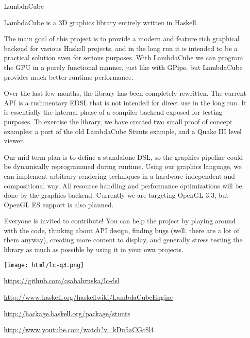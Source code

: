 \begin{hcarentry}[updated]{LambdaCube}
\makeheader

LambdaCube is a 3D graphics library entirely written in Haskell.

The main goal of this project is to provide a modern and feature rich
graphical backend for various Haskell projects, and in the long run it
is intended to be a practical solution even for serious purposes.
With LambdaCube we can program the GPU in a purely functional manner,
just like with GPipe, but LambdaCube provides much better runtime
performance.

Over the last few months, the library has been completely rewritten.
The current API is a rudimentary EDSL that is not intended for direct
use in the long run.  It is essentially the internal phase of a
compiler backend exposed for testing purposes.  To exercise the library, we
have created two small proof of concept examples: a port of the old
LambdaCube Stunts example, and a Quake III level viewer.

Our mid term plan is to define a standalone DSL, so the graphics
pipeline could be dynamically reprogrammed during runtime.  Using our
graphics language, we can implement arbitrary rendering techniques in
a hardware independent and compositional way.  All resource handling
and performance optimizations will be done by the graphics backend.
Currently we are targeting OpenGL 3.3, but OpenGL ES support is
also planned.

Everyone is invited to contribute! You can help the project by playing
around with the code, thinking about API design, finding bugs (well,
there are a lot of them anyway), creating more content to display, and
generally stress testing the library as much as possible by using it
in your own projects.

\begin{center}
\texttt{[image: html/lc-q3.png]}
\end{center}

\FurtherReading
\begin{compactitem}
\item \url{https://github.com/csabahruska/lc-dsl}
\item \url{http://www.haskell.org/haskellwiki/LambdaCubeEngine}
\item \url{http://hackage.haskell.org/package/stunts}
\item \url{http://www.youtube.com/watch?v=kDu5aCGc8l4}
\end{compactitem}
\end{hcarentry}
